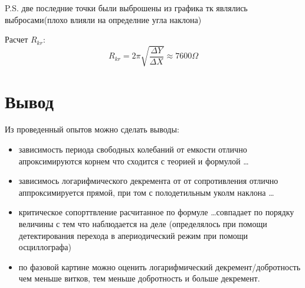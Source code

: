 \documentclass[a4paper, 12pt]{article}
\begin{document}
P.S. две последние точки были выброшены из графика тк являлись выбросами(плохо влияли на определние угла наклона) 

Расчет $R_{kr}$:
\[R_{kr} = 2\pi \sqrt{\frac{\Delta Y}{\Delta X}} \approx 7600 \Omega\]



\section{Вывод}
Из проведенный опытов можно сделать выводы:
\begin{itemize}
    \item зависимость периода свободных колебаний от емкости
    отлично апроксимируются корнем что сходится с теорией и формулой \dots
    \item зависимось логарифмического декремента от от сопротивления 
    отлично аппроксимируется прямой, при том с полодетильным уколм наклона \dots
    \item критическое сопорттвление расчитанное по формуле \dots совпадает по порядку величины 
    с тем что наблюдается на деле (определялось при помощи детектирования перехода 
    в апериодический режим при помощи осциллографа)
    \item по фазовой картине можно оценить логарифмический декремент/добротность
    чем меньше витков, тем меньше добротность и больше декремент.
\end{itemize}
\end{document}
